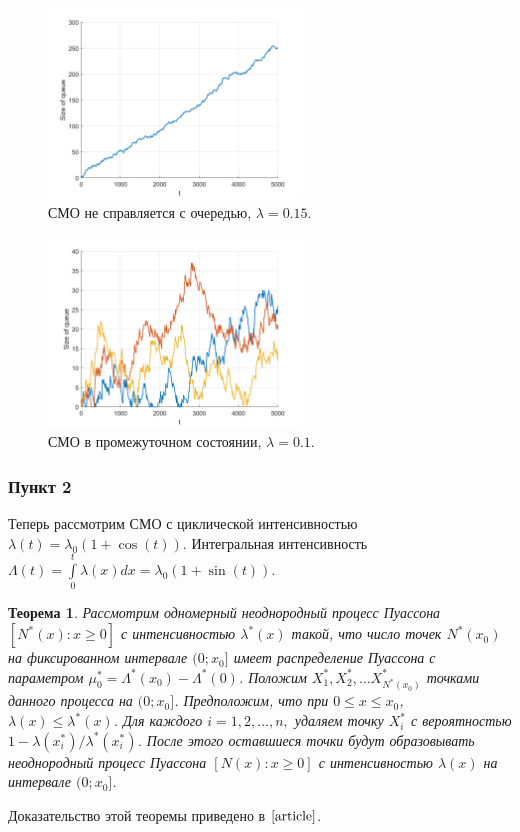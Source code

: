 \documentclass[oneside, final, 12pt]{article}
\newtheorem{theorem}{Теорема}
\begin{document}
    \begin{figure}[h!]
		\centering
		\includegraphics[width=0.6\textwidth]{../code/Task_11/pict/hom_15_ex.png}
		\caption{СМО не справляется с очередью, $\lambda =  0.15$.}
    \end{figure}
    \begin{figure}[h!]
		\centering
		\includegraphics[width=0.6\textwidth]{../code/Task_11/pict/hom_10_ex.png}
		\caption{СМО в промежуточном состоянии, $\lambda =  0.1$.}
    \end{figure}

\newpage    
\subsubsection{Пункт 2}

	Теперь рассмотрим СМО с циклической интенсивностью $\lambda(t) = \lambda_0 (1+\cos(t))$. Интегральная 
	интенсивность $\Lambda(t) = \int\limits_0^t \lambda(x)dx = \lambda_0 (1+\sin(t))$.
	\begin{theorem}
		Рассмотрим одномерный неоднородный процесс Пуассона $[N^*(x): x\geqslant 0]$ с интенсивностью
		$\lambda^*(x)$ такой, что число точек $N^*(x_0)$ на фиксированном интервале $(0;x_0]$ имеет 
		распределение Пуассона с параметром $\mu^*_0 = \Lambda^*(x_0)-\Lambda^*(0)$. 
		Положим $X^*_1, X^*_2,\ldots X^*_{N^*(x_0)}$ точками данного процесса на $(0;x_0]$. 
		Предположим, что при $0 \leqslant x \leqslant x_0$, $\lambda(x) \leqslant \lambda^*(x)$. 
		Для каждого $i = 1,2,\ldots, n,$ удаляем точку $X^*_i$ с вероятностью
		$1-\lambda(x^*_i) \slash \lambda^*(x^*_i)$. 
		После этого оставшиеся точки будут образовывать неоднородный процесс Пуассона
		$[N(x): x\geqslant 0]$ с интенсивностью $\lambda(x)$  на интервале $(0;x_0]$.
	\end{theorem}
	Доказательство этой теоремы приведено в $\cite{article}$.
	
\end{document}
